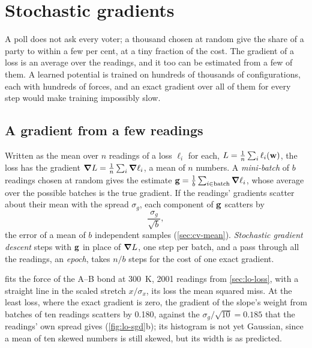\section{Stochastic gradients}
\label{sec:lo-sgd}

A poll does not ask every voter; a thousand chosen at random give the
share of a party to within a few per cent, at a tiny fraction of the
cost. The gradient of a loss is an average over the readings, and it too
can be estimated from a few of them. A learned potential is trained on
hundreds of thousands of configurations, each with hundreds of forces,
and an exact gradient over all of them for every step would make training
impossibly slow.

\subsection*{A gradient from a few readings}

Written as the mean over $n$ readings of a loss $\ell_i$ for each,
$L = \frac1n\sum_i\ell_i(\bm{\mathrm{w}})$, the loss has the gradient $\bm{\nabla} L =
\frac1n\sum_i\bm{\nabla}\ell_i$, a mean of $n$ numbers. A \emph{mini-batch} of
$b$ readings chosen at random gives the estimate $\bm{\mathrm{g}} =
\frac1b\sum_{i\in\text{batch}}\bm{\nabla}\ell_i$, whose average over the
possible batches is the true gradient. If the readings' gradients scatter
about their mean with the spread $\sigma_g$, each component of $\bm{\mathrm{g}}$
scatters by
\begin{equation*}
   \frac{\sigma_g}{\sqrt b} ,
\end{equation*}
the error of a mean of $b$ independent samples (\cref{sec:cv-mean}).
\emph{Stochastic gradient descent} steps with $\bm{\mathrm{g}}$ in place of
$\bm{\nabla} L$, one step per batch, and a pass through all the readings, an
\emph{epoch}, takes $n/b$ steps for the cost of one exact gradient.

 fits the force of the A--B bond at \SI{300}{\kelvin},
2001 readings from \cref{sec:lo-loss}, with a straight line in the
scaled stretch $x/\sigma_x$, its loss the mean squared miss. At the least
loss, where the exact gradient is zero, the gradient of the slope's
weight from batches of ten readings scatters by \num{0.180}, against the
$\sigma_g/\sqrt{10} = \num{0.185}$ that the readings' own spread gives
(\cref{fig:lo-sgd}b); its histogram is not yet Gaussian, since a mean of
ten skewed numbers is still skewed, but its width is as predicted.

